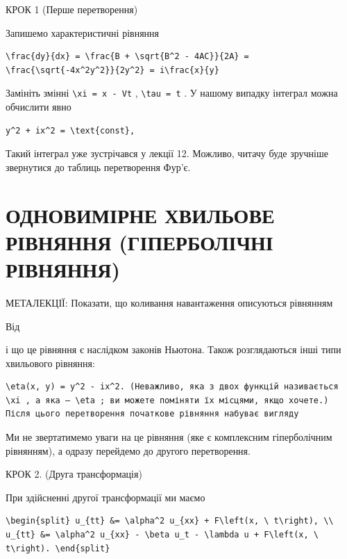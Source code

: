 \documentclass[
  ukrainian,
]{article}
\begin{document}
КРОК 1 (Перше перетворення)

Запишемо характеристичні рівняння

\begin{verbatim}
\frac{dy}{dx} = \frac{B + \sqrt{B^2 - 4AC}}{2A} = \frac{\sqrt{-4x^2y^2}}{2y^2} = i\frac{x}{y}
\end{verbatim}

Замініть змінні \texttt{\textbackslash{}xi\ =\ x\ -\ Vt} ,
\texttt{\textbackslash{}tau\ =\ t} . У нашому випадку інтеграл можна
обчислити явно

\begin{verbatim}
y^2 + ix^2 = \text{const},
\end{verbatim}

Такий інтеграл уже зустрічався у лекції 12. Можливо, читачу буде
зручніше звернутися до таблиць перетворення Фур'є.

\section{ОДНОВИМІРНЕ ХВИЛЬОВЕ РІВНЯННЯ (ГІПЕРБОЛІЧНІ
РІВНЯННЯ)}\label{ux43eux434ux43dux43eux432ux438ux43cux456ux440ux43dux435-ux445ux432ux438ux43bux44cux43eux432ux435-ux440ux456ux432ux43dux44fux43dux43dux44f-ux433ux456ux43fux435ux440ux431ux43eux43bux456ux447ux43dux456-ux440ux456ux432ux43dux44fux43dux43dux44f}

МЕТАЛЕКЦІЇ: Показати, що коливання навантаження описуються рівнянням

Від

і що це рівняння є наслідком законів Ньютона. Також розглядаються інші
типи хвильового рівняння:

\begin{verbatim}
\eta(x, y) = y^2 - ix^2. (Неважливо, яка з двох функцій називається \xi , а яка — \eta ; ви можете поміняти їх місцями, якщо хочете.) Після цього перетворення початкове рівняння набуває вигляду
\end{verbatim}

Ми не звертатимемо уваги на це рівняння (яке є комплексним гіперболічним
рівнянням), а одразу перейдемо до другого перетворення.

КРОК 2. (Друга трансформація)

При здійсненні другої трансформації ми маємо

\begin{verbatim}
\begin{split} u_{tt} &= \alpha^2 u_{xx} + F\left(x, \ t\right), \\ u_{tt} &= \alpha^2 u_{xx} - \beta u_t - \lambda u + F\left(x, \ t\right). \end{split}
\end{verbatim}
\end{document}

